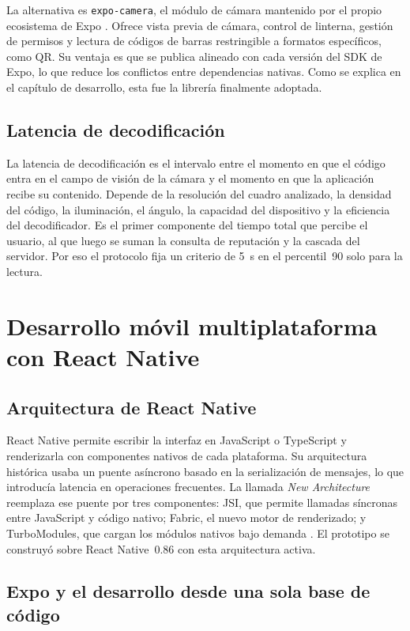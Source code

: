 La alternativa es \texttt{expo-camera}, el módulo de cámara mantenido por el propio ecosistema de Expo \cite{expo_camera}. Ofrece vista previa de cámara, control de linterna, gestión de permisos y lectura de códigos de barras restringible a formatos específicos, como QR. Su ventaja es que se publica alineado con cada versión del SDK de Expo, lo que reduce los conflictos entre dependencias nativas. Como se explica en el capítulo de desarrollo, esta fue la librería finalmente adoptada.

\subsection{Latencia de decodificación}

La latencia de decodificación es el intervalo entre el momento en que el código entra en el campo de visión de la cámara y el momento en que la aplicación recibe su contenido. Depende de la resolución del cuadro analizado, la densidad del código, la iluminación, el ángulo, la capacidad del dispositivo y la eficiencia del decodificador. Es el primer componente del tiempo total que percibe el usuario, al que luego se suman la consulta de reputación y la cascada del servidor. Por eso el protocolo fija un criterio de 5~s en el percentil~90 solo para la lectura.

\section{Desarrollo móvil multiplataforma con React Native}

\subsection{Arquitectura de React Native}

React Native permite escribir la interfaz en JavaScript o TypeScript y renderizarla con componentes nativos de cada plataforma. Su arquitectura histórica usaba un puente asíncrono basado en la serialización de mensajes, lo que introducía latencia en operaciones frecuentes. La llamada \emph{New Architecture} reemplaza ese puente por tres componentes: JSI, que permite llamadas síncronas entre JavaScript y código nativo; Fabric, el nuevo motor de renderizado; y TurboModules, que cargan los módulos nativos bajo demanda \cite{meta_rn_newarch}. El prototipo se construyó sobre React Native~0.86 con esta arquitectura activa.

\subsection{Expo y el desarrollo desde una sola base de código}

